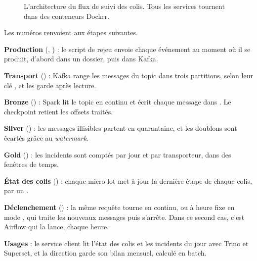 \begin{figure}[H]
{}
\caption{L'architecture du flux de suivi des colis. Tous les services tournent dans des conteneurs Docker.}
\label{c6:fig:archi}
\end{figure}

Les numéros renvoient aux étapes suivantes.

\begin{description}[leftmargin=1.4em,labelindent=0pt,itemsep=3pt,font=\normalfont]
\item[\etape{1}] \textbf{Production} (, ) : le script de
  rejeu envoie chaque événement au moment où il se produit, d'abord dans un dossier, puis dans Kafka.
\item[\etape{2}] \textbf{Transport} () : Kafka range les messages du topic
   dans trois partitions, selon leur clé , et les garde après lecture.
\item[\etape{3}] \textbf{Bronze} () : Spark lit le topic en continu et écrit
  chaque message dans . Le checkpoint retient les offsets traités.
\item[\etape{4}] \textbf{Silver} () : les messages illisibles partent en
  quarantaine, et les doublons sont écartés grâce au \emph{watermark}.
\item[\etape{5}] \textbf{Gold} () : les incidents sont comptés par jour et par
  transporteur, dans des fenêtres de temps.
\item[\etape{6}] \textbf{État des colis} () : chaque micro-lot met à jour la
  dernière étape de chaque colis, par un .
\item[\etape{7}] \textbf{Déclenchement} () : la même requête tourne en
  continu, ou à heure fixe en mode , qui traite les nouveaux messages puis s'arrête.
  Dans ce second cas, c'est Airflow qui la lance, chaque heure.
\item[\etape{8}] \textbf{Usages} : le service client lit l'état des colis et les incidents du jour
  avec Trino et Superset, et la direction garde son bilan mensuel, calculé en batch.
\end{description}


